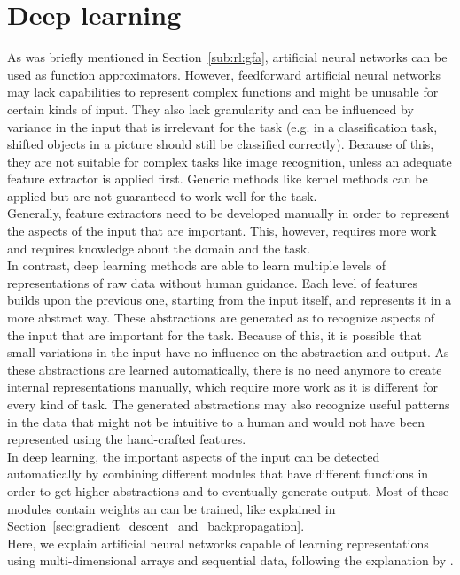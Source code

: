 \chapter{Deep learning}
\label{cha:deep_learning}

As was briefly mentioned in Section~\ref{sub:rl:gfa}, artificial neural networks can be used as function approximators.
However, feedforward artificial neural networks may lack capabilities to represent complex functions and might be unusable for certain kinds of input. They also lack granularity and can be influenced by variance in the input that is irrelevant for the task (e.g. in a classification task, shifted objects in a picture should still be classified correctly). Because of this, they are not suitable for complex tasks like image recognition, unless an adequate feature extractor is applied first. Generic methods like kernel methods can be applied but are not guaranteed to work well for the task.\\
Generally, feature extractors need to be developed manually in order to represent the aspects of the input that are important. This, however, requires more work and requires knowledge about the domain and the task.\\

In contrast, deep learning methods are able to learn multiple levels of representations of raw data without human guidance.
Each level of features builds upon the previous one, starting from the input itself, and represents it in a more abstract way. These abstractions are generated as to recognize aspects of the input that are important for the task. Because of this, it is possible that small variations in the input have no influence on the abstraction and output.
As these abstractions are learned automatically, there is no need anymore to create internal representations manually, which require more work as it is different for every kind of task. The generated abstractions may also recognize useful patterns in the data that might not be intuitive to a human and would not have been represented using the hand-crafted features.\\

In deep learning, the important aspects of the input can be detected automatically by combining different modules that have different functions in order to get higher abstractions and to eventually generate output.
Most of these modules contain weights an can be trained, like explained in Section~\ref{sec:gradient_descent_and_backpropagation}.\\
Here, we explain artificial neural networks capable of learning representations using multi-dimensional arrays and sequential data, following the explanation by \cite{LeCun2015DeepLearning}.

